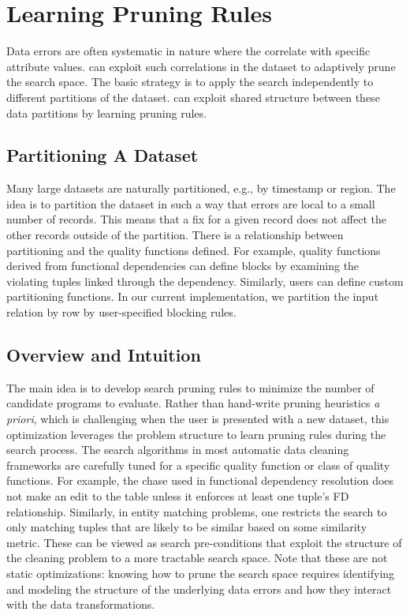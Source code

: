 \section{Learning Pruning Rules}
Data errors are often systematic in nature where the correlate with specific attribute values.
\sys can exploit such correlations in the dataset to adaptively prune the search space.
The basic strategy is to apply the search independently to different partitions of the dataset.
\sys can exploit shared structure between these data partitions by learning pruning rules.

\subsection{Partitioning A Dataset}
Many large datasets are naturally partitioned, e.g., by timestamp or region. 
The idea is to partition the dataset in such a way that errors are local to a small number of records.
This means that a fix for a given record does not affect the other records outside of the partition.
There is a relationship between partitioning and the quality functions defined.
For example, quality functions derived from functional dependencies can define blocks by examining the violating tuples linked through the dependency.  Similarly, users can define custom partitioning functions.  In our current implementation, we partition the input relation by row by user-specified blocking rules.

\subsection{Overview and Intuition}\label{s:dynlearn}
The main idea is to develop search pruning rules to minimize the number of candidate programs to evaluate.  Rather than hand-write pruning heuristics {\it a priori}, which is challenging when the user is presented with a new dataset, this optimization leverages the problem structure to learn pruning rules during the search process.
The search algorithms in  most automatic data cleaning frameworks are carefully tuned for a specific quality function or class of quality functions. For example, the chase used in functional dependency resolution does not make an edit to the table unless it enforces at least one tuple's FD relationship.    Similarly, in entity matching problems, one restricts the search to only matching tuples that are likely to be similar based on some similarity metric.
These can be viewed as search pre-conditions that exploit the structure of the cleaning problem to a more tractable search space.
Note that these are not static optimizations: knowing how to prune the search space requires identifying and modeling the structure of the underlying data errors and how they interact with the data transformations.


